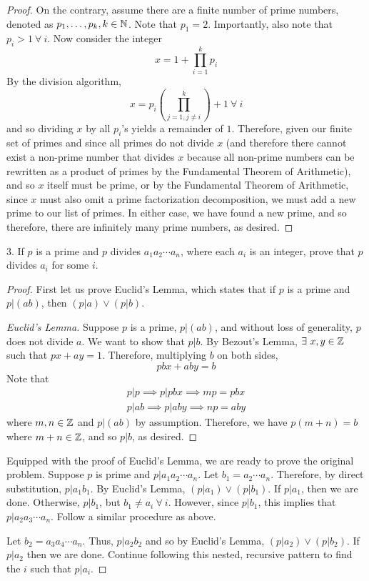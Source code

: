 \documentclass[12pt]{scrartcl}
\begin{document}
\begin{proof}
  On the contrary, assume there are a finite number of prime numbers, denoted as 
  $p_1, \ldots, p_k, k \in \mathbb N$. Note that $p_1 = 2$. Importantly, also note that 
  $p_i > 1 \ \forall \ i$. Now consider the integer 
  \[x = 1 + \prod_{i=1}^k p_i\]
  By the division algorithm, 
  \[x = p_i \left(\prod_{j=1, j \neq i}^k \right) + 1 \ \forall \ i\]
  and so dividing $x$ by all $p_i$'s yields a remainder of $1$. Therefore, given our finite set of primes and since 
  all primes do not divide $x$ (and therefore there cannot exist a non-prime number that divides $x$ because all non-prime numbers
  can be rewritten as a product of primes by the Fundamental Theorem of Arithmetic), and so $x$ itself must be prime, 
  or by the Fundamental Theorem of Arithmetic, since $x$ must also omit a prime factorization decomposition, we must add a new prime 
  to our list of primes. In either case, we have found a new prime, and so therefore, there are infinitely many prime numbers,
  as desired.
\end{proof}

\newpage

$3.$ If $p$ is a prime and $p$ divides $a_1a_2 \cdots a_n$, where each $a_i$ is an integer, prove that 
$p$ divides $a_i$ for some $i$. 


\begin{proof} 
  First let us prove Euclid's Lemma, which states that if $p$ is a prime and $p | (ab)$, then 
  $(p | a) \lor (p | b)$.

  \begin{proof}[Euclid's Lemma]
    Suppose $p$ is a prime, $p | (ab)$, and without loss of generality, $p$ does not divide $a$. We want to 
    show that $p | b$. By Bezout's Lemma, $\exists \ x, y \in \mathbb Z$ such that $px + ay = 1$. Therefore, 
    multiplying $b$ on both sides, 
    \[pbx + aby = b\]
    Note that
    \begin{align*}
      p | p \implies p | pbx \implies mp = pbx\\
      p | ab \implies p | aby \implies np = aby
    \end{align*}
    where $m, n \in \mathbb Z$ and $p | (ab)$ by assumption. Therefore, we have $p(m + n) = b$ where 
    $m + n \in \mathbb Z$,
    and so $p | b$, as desired.
  \end{proof}

  Equipped with the proof of Euclid's Lemma, we are ready to prove the original problem. Suppose $p$ is prime and $p | a_1a_2\cdots a_n$.
  Let $b_1 = a_2\cdots a_n$. Therefore, by direct substitution, $p | a_1 b_1$. By Euclid's Lemma, 
  $(p | a_1) \lor (p | b_1)$. If $p | a_1$, then we are done. Otherwise, $p | b_1$, but $b_1 \neq a_i \ \forall \ i$. However, since 
  $p | b_1$, this implies that $p | a_2a_3\cdots a_n$. Follow a similar procedure as above. 

  \hfill

  Let $b_2 = a_3a_4 \cdots a_n$. Thus, $p | a_2 b_2$ and so by Euclid's Lemma, $(p | a_2) \lor (p | b_2)$. 
  If $p | a_2$ then we are done. Continue following this nested, recursive pattern to find the $i$ such that 
  $p | a_i$. 


\end{proof}
\end{document}
